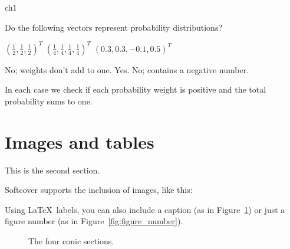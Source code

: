 \begin{exercises}{ch1}

	\begin{exercise} 
		Do the following vectors represent probability distributions?
		\begin{exparts*}
			\partsitem	$\left(\tfrac{1}{2}, \tfrac{1}{2}, \tfrac{1}{2} \right)^T$
			\partsitem	$\left(\tfrac{1}{4}, \tfrac{1}{4}, \tfrac{1}{4}, \tfrac{1}{4} \right)^T$
			\partsitem	$\left(0.3, 0.3, -0.1, 0.5  \right)^T$
		\end{exparts*}

		\begin{eanswer}\begin{ansparts*}
					\partsitem No; weights don't add to one.
					\partsitem Yes.
					\partsitem No; contains a negative number.
					\end{ansparts*}\end{eanswer}

		\begin{esolution}
			In each case we check if each probability weight is positive and
			the total probability sums to one.
		\end{esolution}
	\end{exercise}

\end{exercises}




\section{Images and tables}

This is the second section.

Softcover supports the inclusion of images, like this:


Using \LaTeX\ labels, you can also include a caption (as in Figure~\ref{fig:captioned_image}) or just a figure number (as in Figure~\ref{fig:figure_number}).

\begin{figure}[H]
\begin{center}
\end{center}
\caption{The four conic sections.\label{fig:captioned_image}}

\end{figure}

